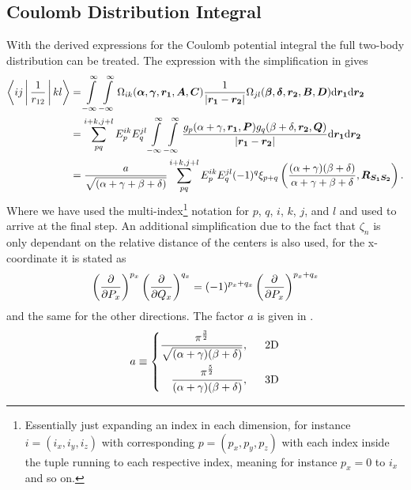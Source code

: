 \subsection{Coulomb Distribution Integral}
    With the derived expressions for the Coulomb potential integral the full
    two-body distribution can be treated. The expression with the
    simplification in  gives
        \begin{align}
            \Braket{ij|\frac{1}{r_{12}}|kl} &= \infint\infint
            \Omega_{ik}(\blds{\alpha},\blds{\gamma},\blds{r_1},
            \blds{A},\blds{C}) \frac{1}{\abs{\blds{r_1} - \blds{r_2}}}
            \Omega_{jl}(\blds{\beta},\blds{\delta},\blds{r_2},
            \blds{B},\blds{D}) \md\blds{r_1} \md\blds{r_2} \nonumber \\
            &= \suml{pq}{i+k,j+l} E^{ik}_pE^{jl}_q \infint\infint
            \frac{g_{p}(\alpha+\gamma,\blds{r_1},\blds{P})
            g_{q}(\beta+\delta,\blds{r_2},\blds{Q})}{\abs{\blds{r_1} -
            \blds{r_2}}} \md\blds{r_1} \md\blds{r_2}\nonumber \\
            &= \frac{a}{\sqrt{(\alpha+\gamma+\beta+\delta)}} \suml{pq}{i+k,j+l}
            E^{ik}_pE^{jl}_q (-1)^{q} \xi_{p+q}\left(\frac{(\alpha +
            \gamma)(\beta + \delta)}{\alpha + \gamma + \beta +
            \delta},\blds{R_{S_1S_2}}\right).
            \label{eq:coulomb_dist_integral_stype}
        \end{align}
    Where we have used the multi-index\footnote{Essentially just expanding an
    index in each dimension, for instance $i=(i_x,i_y,i_z)$ with corresponding
    $p=(p_x, p_y, p_z)$ with each index inside the tuple running to each
    respective index, meaning for instance $p_x=0$ to $i_x$ and so on.}
    notation for $p$, $q$, $i$, $k$, $j$, and $l$ 
    and used  to arrive at the final
    step. An additional simplification due to the fact that $\zeta_n$ is only
    dependant on the relative distance of the centers is also used, for the
    x-coordinate it is stated as
        \begin{equation}
            \left(\frac{\mathrm{\partial}}{\mathrm{\partial} P_x}\right)^{p_x}\left(\frac{\mathrm{\partial}}{\mathrm{\partial} Q_x}\right)^{q_x} = (-1)^{p_x+q_x} \left(\frac{\mathrm{\partial}}{\mathrm{\partial} P_x}\right)^{p_x+q_x}
        \end{equation}
    and the same for the other directions. The factor $a$ is given in
    .
        \begin{equation}
            a \equiv \left\{\begin{aligned}
                \frac{\pi^{\frac{3}{2}}}
                {\sqrt{(\alpha+\gamma)(\beta+\delta)}},\indent \text{2D} \\
                \frac{\pi^{\frac{5}{2}}}
                {(\alpha+\gamma)(\beta+\delta)},\indent \text{3D} \\
            \end{aligned}\right.
            \label{eq:defaaaaa}
        \end{equation}

